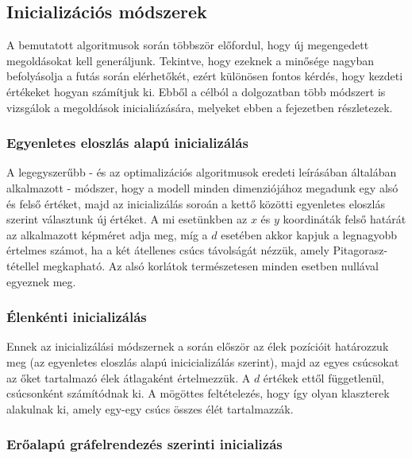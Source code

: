 
\subsection{Inicializációs módszerek} \label{initializationMethods}

A bemutatott algoritmusok során többször előfordul, hogy új megengedett megoldásokat kell generáljunk. Tekintve, hogy ezeknek a minősége nagyban befolyásolja a futás során elérhetőkét, ezért különösen fontos kérdés, hogy kezdeti értékeket hogyan számítjuk ki. Ebből a célból a dolgozatban több módszert is vizsgálok a megoldások inicialiázására, melyeket ebben a fejezetben részletezek.

\subsubsection{Egyenletes eloszlás alapú inicializálás}

A legegyszerűbb - és az optimalizációs algoritmusok eredeti leírásában általában alkalmazott - módszer, hogy a modell minden dimenziójához megadunk egy alsó és felső értéket, majd az inicializálás soroán a kettő közötti egyenletes eloszlás szerint választunk új értéket. A mi esetünkben az $x$ és $y$ koordináták felső határát az alkalmazott képméret adja meg, míg a $d$ esetében akkor kapjuk a legnagyobb értelmes számot, ha a két átellenes csúcs távolságát nézzük, amely Pitagorasz-tétellel megkapható. Az alsó korlátok természetesen minden esetben nullával egyeznek meg.

\subsubsection{Élenkénti inicializálás}

Ennek az inicializálási módszernek a során először az élek pozícióit határozzuk meg (az egyenletes eloszlás alapú inicicializálás szerint), majd az egyes csúcsokat az őket tartalmazó élek átlagaként értelmezzük. A $d$ értékek ettől függetlenül, csúcsonként számítódnak ki. A mögöttes feltételezés, hogy így olyan klaszterek alakulnak ki, amely egy-egy csúcs összes élét tartalmazzák.


\subsubsection{Erőalapú gráfelrendezés szerinti inicializás}

